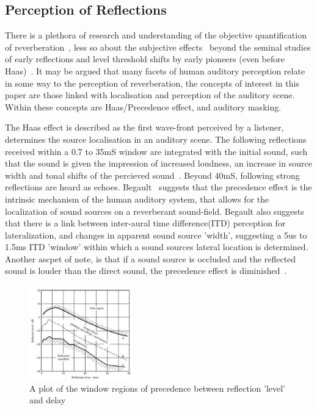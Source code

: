 \documentclass[paper=a4, fontsize=10pt, font=arial]{scrartcl} %
\numberwithin{equation}{section} %
\numberwithin{figure}{section} %
\numberwithin{table}{section} %
\begin{document}
\newpage

\subsection{Perception of Reflections}
There is a plethora of research and understanding of the objective quantification of reverberation~\cite{rossing2007springer}, less so about the subjective effects~\cite{Karjalainen2001} beyond the seminal studies of early reflections and level threshold shifts by early pioneers (even before Haas)~\cite{Haas1972}. 
It may be argued that many facets of human auditory perception relate in some way to the perception of reverberation, the concepts of interest in this paper are those linked with localisation and perception of the auditory scene. 
Within these concepts are Haas/Precedence effect, and auditory masking.

The Haas effect is described as the first wave-front perceived by a listener, determines the source localisation in an auditory scene. The following reflections received within a 0.7 to 35mS window are integrated with the initial sound, such that the sound is given the impression of increased loudness, an increase in source width and tonal shifts of the percieved sound~\cite{Everest2009}. 
Beyond 40mS, following strong reflections are heard as echoes. 
Begault~\cite{Begault1995} suggests that the precedence effect is the intrinsic mechanism  of the human auditory system, that allows for the localization of sound sources on a reverberant sound-field. 
Begault also suggests that there is a link between inter-aural time difference(ITD) perception for lateralization, and changes in apparent sound source 'width', suggesting a 5us to 1.5ms ITD 'window' within which a sound sources lateral location is determined. Another ascpet of note, is that if a sound source is occluded and the reflected sound is louder than the direct sound, the precedence effect is diminished~\cite{Wiggins2004}.

\begin{figure}[H]
\centering
\includegraphics[width=0.4\textwidth]{precedence.jpg}
\caption{A plot of the window regions of precedence between reflection 'level' and delay~\cite{Everest2009}}
\end{figure}
\end{document}
